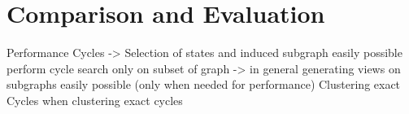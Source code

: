 \documentclass[preview]{standalone}
\begin{document}
\section{Comparison and Evaluation}
Performance Cycles -> Selection of states and induced subgraph easily possible perform cycle search only on subset of graph 
-> in general generating views on subgraphs easily possible (only when needed for performance)
Clustering exact Cycles when clustering exact cycles
\end{document}

